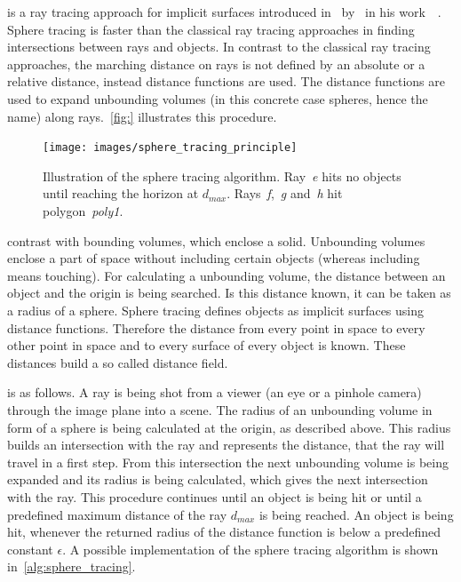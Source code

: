 \documentclass[%
    a4paper,
    nobib,   %
    openany  %
]{tufte-book}
\begin{document}
 is a ray tracing approach for implicit surfaces
introduced in~\citeyear{hart_sphere_1994} by~\citeauthor{hart_sphere_1994} in
his work~~\cite{hart_sphere_1994}. 
Sphere tracing is faster than the classical ray tracing approaches in finding
intersections between rays and objects. In contrast to the classical ray tracing
approaches, the marching distance on rays is not defined by an absolute or a
relative distance, instead distance functions are used. The distance functions
are used to expand unbounding volumes (in this concrete case spheres, hence the
name) along rays.~\autoref{fig:} illustrates this procedure.

\begin{figure}[h]
    \caption{Illustration of the sphere tracing
      algorithm.
      Ray~\textit{e} hits no objects until reaching the horizon at
      $d_{max}$. Rays~\textit{f},~\textit{g} and~\textit{h} hit
      polygon~\textit{poly1}.
      \protect\footnotemark}\label{fig:sphere_tracing_1}
    \centering
    \texttt{[image: images/sphere\_tracing\_principle]}
\end{figure}

 contrast with bounding volumes, which enclose a
solid. Unbounding volumes enclose a part of space without including certain
objects (whereas including means touching). For calculating a unbounding volume,
the distance between an object and the origin is being searched. Is this
distance known, it can be taken as a radius of a sphere. Sphere tracing defines
objects as implicit surfaces using distance functions. Therefore the distance
from every point in space to every other point in space and to every surface of
every object is known. These distances build a so called distance field.

 is as follows. A ray is being shot
from a viewer (an eye or a pinhole camera) through the image plane into a scene.
The radius of an unbounding volume in form of a sphere is being calculated at
the origin, as described above. This radius builds an intersection with the ray
and represents the distance, that the ray will travel in a first step. From this
intersection the next unbounding volume is being expanded and its radius is
being calculated, which gives the next intersection with the ray. This procedure
continues until an object is being hit or until a predefined maximum distance of
the ray $d_{max}$ is being reached. An object is being hit, whenever the
returned radius of the distance function is below a predefined constant
$\epsilon$. A possible implementation of the sphere tracing algorithm is shown
in~\autoref{alg:sphere_tracing}.
\end{document}
